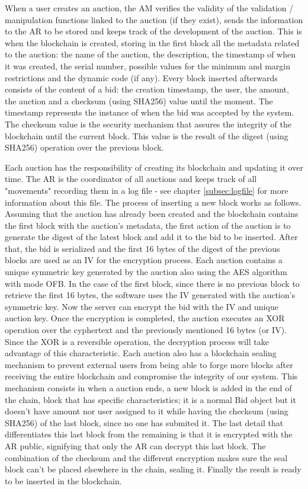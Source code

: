 \documentclass[a4paper]{article}
\begin{document}
When a user creates an auction, the AM verifies the validity of the validation / manipulation functions linked to the auction (if they exist), sends the information to the AR to be stored and keeps track of the development of the auction.
This is when the blockchain is created, storing in the first block all the metadata related to the auction: the name of the auction, the description, the timestamp of when it was created, the serial number, possible values for the minimum and margin restrictions and the dynamic code (if any).
Every block inserted afterwards consists of the content of a bid: the creation timestamp, the user, the amount, the auction and a checksum (using SHA256) value until the moment. 
The timestamp represents the instance of when the bid was accepted by the system.
The checksum value is the security mechanism that assures the integrity of the blockchain until the current block. 
This value is the result of the digest (using SHA256) operation over the previous block.

Each auction has the responsibility of creating its blockchain and updating it over time.
The AR is the coordinator of all auctions and keeps track of all "movements" recording them in a log file - see chapter \ref{subsec:logfile} for more information about this file.
The process of inserting a new block works as follows.
Assuming that the auction has already been created and the blockchain contains the first block with the auction's metadata, the first action of the auction is to generate the digest of the latest block and add it to the bid to be inserted.
After that, the bid is serialized and the first 16 bytes of the digest of the previous blocks are used as an IV for the encryption process.
Each auction contains a unique symmetric key generated by the auction also using the AES algorithm with mode OFB.
In the case of the first block, since there is no previous block to retrieve the first 16 bytes, the software uses the IV generated with the auction's symmetric key.
Now the server can encrypt the bid with the IV and unique auction key.
Once the encryption is completed, the auction executes an XOR operation over the cyphertext and the previously mentioned 16 bytes (or IV).
Since the XOR is a reversible operation, the decryption process will take advantage of this characteristic.
Each auction also has a blockchain sealing mechanism to prevent external users from being able to forge more blocks after receiving the entire blockchain and compromise the integrity of our system. 
\newline
This mechanism consists in when a auction ends, a new block is added in the end of the chain, block that has specific characteristics; it is a normal Bid object but it doesn't have amount nor user assigned to it while having the checksum (using SHA256) of the last block, since no one has submited it. The last detail that differentiates this last block from the remaining is that it is encrypted with the AR public, signifying that only the AR can decrypt this last block. The combination of the checksum and the different encryption makes sure the seal block can't be placed elsewhere in the chain, sealing it.
Finally the result is ready to be inserted in the blockchain.
\end{document}
